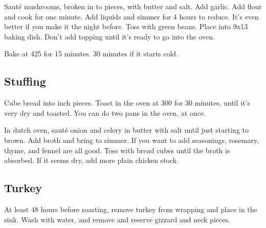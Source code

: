 \begin{recipe}
Sauté mushrooms, broken in to pieces, with butter and salt. Add garlic. Add flour and cook for one minute. Add liquids and simmer for 4 hours to reduce. It's even better if you make it the night before. Toss with green beans. Place into 9x13 baking dish. Don't add topping until it's ready to go into the oven.

Bake at 425 for 15 minutes. 30 minutes if it starts cold. 

\subsection{Stuffing}



Cube bread into  inch pieces. Toast in the oven at 300\degree{} for 30 minutes, until it's very dry and toasted. You can do two pans in the oven, at once. 



In dutch oven, sauté onion and celery in butter with salt until just starting to brown. Add broth and bring to simmer. If you want to add seasonings, rosemary, thyme, and fennel are all good. Toss with bread cubes until the broth is absorbed. If it seems dry, add more plain chicken stock. 

\subsection{Turkey}



At least 48 hours before roasting, remove turkey from wrapping and place in the sink.
Wash with water, and remove and reserve gizzard and neck pieces.


\end{recipe}
